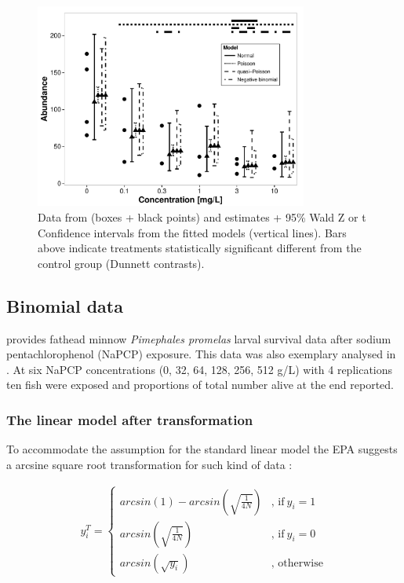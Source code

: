 \documentclass{scrartcl}
\begin{document}
\begin{figure}
  \centering
  \includegraphics[width = 0.8\textwidth]{example.pdf}
  \caption{Data from \citet{brock_minimum_2014} (boxes + black points) and estimates + 95\% Wald Z or t Confidence intervals from the fitted models (vertical lines). 
  Bars above indicate treatments statistically significant different from the control group (Dunnett contrasts).}
  \label{fig:example}
\end{figure}

\subsection{Binomial data}
\citet{weber_short-term_1989} provides fathead minnow \textit{Pimephales promelas} larval survival data after sodium pentachlorophenol (NaPCP) exposure.
This data was also exemplary analysed in \citet{newman_quantitative_2012}.
At six NaPCP concentrations (0, 32, 64, 128, 256, 512 \textmu g/L) with 4 replications ten fish were exposed and proportions of total number alive at the end reported.

\subsubsection{The linear model after transformation}
To accommodate the assumption for the standard linear model the EPA suggests a arcsine square root transformation for such kind of data \cite{epa_methods_2002}:

\begin{align}
  y_i^T = 
  \begin{cases}  
    arcsin(1) - arcsin(\sqrt{\frac{1}{4N}}) & \text{, if}\ y_i = 1 \\
    arcsin(\sqrt{\frac{1}{4N}}) & \text{, if}\ y_i = 0  \\
    arcsin(\sqrt{y_i}) & \text{, otherwise}
  \end{cases} \label{eqn:arcsine}
\end{align}
\end{document}
